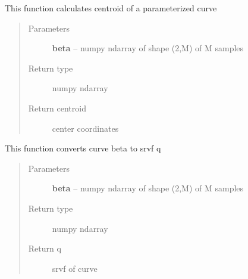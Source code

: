 \documentclass[letterpaper,10pt,english]{sphinxmanual}
\begin{document}
\begin{fulllineitems}
\label{curve_functions:curve_functions.calculatecentroid}
This function calculates centroid of a parameterized curve
\begin{quote}\begin{description}
\item[{Parameters}] \leavevmode
\textbf{beta} -- numpy ndarray of shape (2,M) of M samples

\item[{Return type}] \leavevmode
numpy ndarray

\item[{Return centroid}] \leavevmode
center coordinates

\end{description}\end{quote}

\end{fulllineitems}


\begin{fulllineitems}
\label{curve_functions:curve_functions.curve_to_q}
This function converts curve beta to srvf q
\begin{quote}\begin{description}
\item[{Parameters}] \leavevmode
\textbf{beta} -- numpy ndarray of shape (2,M) of M samples

\item[{Return type}] \leavevmode
numpy ndarray

\item[{Return q}] \leavevmode
srvf of curve

\end{description}\end{quote}

\end{fulllineitems}

\end{document}

